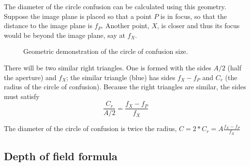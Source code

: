 \documentclass[
  letterpaper,
]{book}
\begin{document}
\begin{tcolorbox}[enhanced jigsaw, title=\textcolor{quarto-callout-note-color}{\faInfo}\hspace{0.5em}{Deriving the CoC formula}, colback=white, colframe=quarto-callout-note-color-frame, leftrule=.75mm, breakable, arc=.35mm, toptitle=1mm, left=2mm, colbacktitle=quarto-callout-note-color!10!white, toprule=.15mm, bottomrule=.15mm, coltitle=black, bottomtitle=1mm, titlerule=0mm, rightrule=.15mm, opacitybacktitle=0.6, opacityback=0]

The diameter of the circle confusion can be calculated using this
geometry. Suppose the image plane is placed so that a point \(P\) is in
focus, so that the distance to the image plane is \(f_P\). Another
point, \(X\), is closer and thus its focus would be beyond the image
plane, say at \(f_X\).

\begin{figure}[H]


\caption{\label{fig-optics-coc-callout}Geometric demonstration of the
circle of confusion size.}

\end{figure}%

There will be two similar right triangles. One is formed with the sides
\(A/2\) (half the aperture) and \(f_X\); the similar triangle (blue) has
sides \(f_X - f_P\) and \(C_r\) (the radius of the circle of confusion).
Because the right triangles are similar, the sides must satisfy \[
\frac{C_r}{A/2} = \frac{f_X - f_P}{f_X}
\]

The diameter of the circle of confusion is twice the radius,
\(C = 2*C_r = A \frac{f_X - f_P}{f_X}\)

\end{tcolorbox}

\subsection{Depth of field formula}\label{sec-optics-dof-formula}
\end{document}
